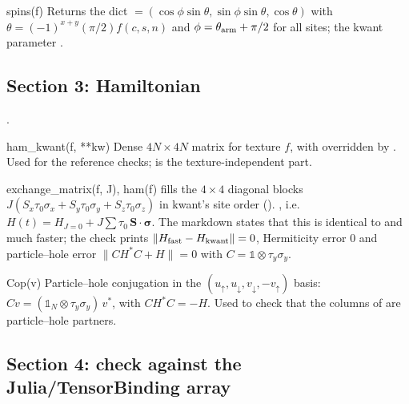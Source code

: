\begin{function}{spins(f)}
Returns the dict  $=(\cos\phi\sin\theta, \sin\phi\sin\theta, \cos\theta)$ with $\theta = (-1)^{x+y}(\pi/2)f(c,s,n)$ and
$\phi = \theta_{\rm arm}+\pi/2$ for all sites; the kwant parameter .
\end{function}

\subsection{Section 3: Hamiltonian}

.

\begin{function}{ham\_kwant(f, **kw)}
Dense $4N\times4N$ matrix  for texture $f$, with  overridden by . Used for the
reference checks;  is the texture-independent part.
\end{function}

\begin{function}{exchange\_matrix(f, J), ham(f)}
 fills the $4\times4$ diagonal blocks $J(S_x\tau_0\sigma_x + S_y\tau_0\sigma_y + S_z\tau_0\sigma_z)$ in kwant's site order
(). , i.e.\ $H(t) = H_{J=0} + J\sum\tau_0\,\mathbf S\cdot\boldsymbol\sigma$. The markdown
states that this is identical to  and much faster; the check prints $\|H_{\rm fast} - H_{\rm kwant}\| = 0$, Hermiticity
error 0 and particle--hole error $\|CH^*C + H\| = 0$ with $C = \mathbb1\otimes\tau_y\sigma_y$.
\end{function}

\begin{function}{Cop(v)}
Particle--hole conjugation in the $(u_\uparrow, u_\downarrow, v_\downarrow, -v_\uparrow)$ basis: $C v = (\mathbb1_N\otimes\tau_y\sigma_y)\,v^*$, with
$CH^*C = -H$. Used to check that the columns of  are particle--hole partners.
\end{function}

\subsection{Section 4: check against the Julia/TensorBinding array}

